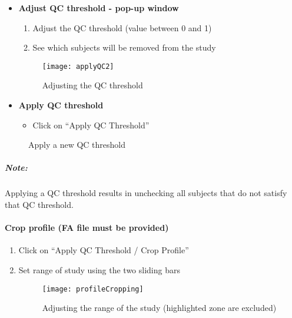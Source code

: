 \documentclass[fadttsterUserGuide_use]{subfiles}
\begin{document}
	\begin{itemize}
		\item \textbf{Adjust QC threshold - pop-up window}
		\begin{enumerate}
			\item Adjust the QC threshold (value between 0 and 1)
			\item See which subjects will be removed from the study
		\end{enumerate}
		\begin{figure}[H]
  			\texttt{[image: applyQC2]}
  			\caption{Adjusting the QC threshold}
    		\label{fig:applyQC2}
		\end{figure}
	\end{itemize}
	\begin{itemize}
		\item \textbf{Apply QC threshold}
		\begin{itemize}
			\item Click on ``Apply QC Threshold''
		\end{itemize}
	\end{itemize}
	\begin{figure}[H]
    	\caption{Apply a new QC threshold}
    	\label{fig:applyQCFinal}
	\end{figure}
	\subparagraph{\textbf{Note:}} Applying a QC threshold results in unchecking all subjects that do not satisfy that QC threshold.
	\vfill
	\newpage
	
	\paragraph{Crop profile (FA file must be provided)}
	\begin{enumerate}
		\item Click on ``Apply QC Threshold / Crop Profile''
		\item Set range of study using the two sliding bars
		\begin{figure}[H]
  			\texttt{[image: profileCropping]}
  			\caption{Adjusting the range of the study (highlighted zone are excluded)}
    		\label{fig:profileCropping}
		\end{figure}	
	\end{enumerate}
\end{document}
